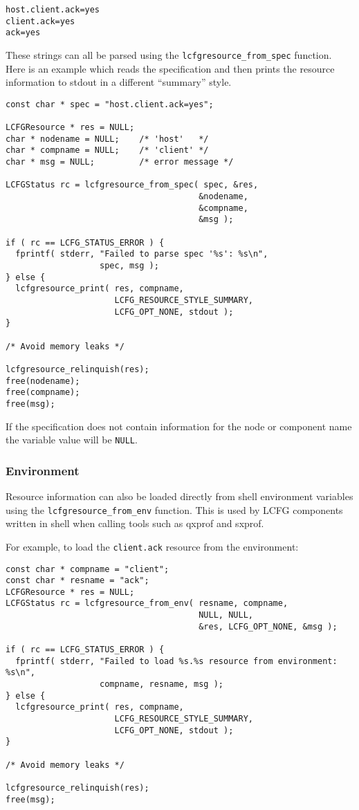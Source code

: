 \documentclass[11pt,a4paper,titlepage]{article}
\begin{document}
\begin{verbatim}
host.client.ack=yes
client.ack=yes
ack=yes
\end{verbatim}

These strings can all be parsed using the
\texttt{lcfgresource\_from\_spec} function. Here is an example which
reads the specification and then prints the resource information to
stdout in a different ``summary'' style.

\begin{verbatim}
const char * spec = "host.client.ack=yes";

LCFGResource * res = NULL;
char * nodename = NULL;    /* 'host'   */
char * compname = NULL;    /* 'client' */
char * msg = NULL;         /* error message */

LCFGStatus rc = lcfgresource_from_spec( spec, &res,
                                       &nodename,
                                       &compname,
                                       &msg );

if ( rc == LCFG_STATUS_ERROR ) {
  fprintf( stderr, "Failed to parse spec '%s': %s\n",
                   spec, msg );
} else {
  lcfgresource_print( res, compname,
                      LCFG_RESOURCE_STYLE_SUMMARY,
                      LCFG_OPT_NONE, stdout );
}

/* Avoid memory leaks */

lcfgresource_relinquish(res);
free(nodename);
free(compname);
free(msg);
\end{verbatim}

If the specification does not contain information for the node or
component name the variable value will be \texttt{NULL}.

\subsubsection{Environment}
\label{subsec:res_env}

Resource information can also be loaded directly from shell
environment variables using the \texttt{lcfgresource\_from\_env}
function. This is used by LCFG components written in shell when
calling tools such as qxprof and sxprof.

For example, to load the \texttt{client.ack} resource from the environment:

\begin{verbatim}
const char * compname = "client";
const char * resname = "ack";
LCFGResource * res = NULL;
LCFGStatus rc = lcfgresource_from_env( resname, compname,
                                       NULL, NULL,
                                       &res, LCFG_OPT_NONE, &msg );

if ( rc == LCFG_STATUS_ERROR ) {
  fprintf( stderr, "Failed to load %s.%s resource from environment: %s\n",
                   compname, resname, msg );
} else {
  lcfgresource_print( res, compname,
                      LCFG_RESOURCE_STYLE_SUMMARY,
                      LCFG_OPT_NONE, stdout );
}

/* Avoid memory leaks */

lcfgresource_relinquish(res);
free(msg);
\end{verbatim}
\end{document}
